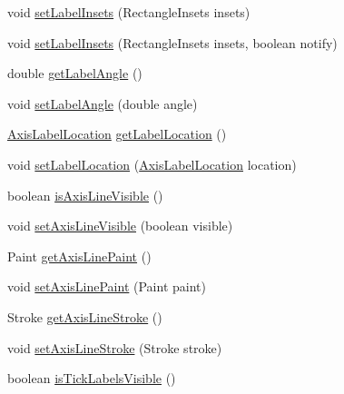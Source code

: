 \begin{DoxyCompactItemize}
\item 
void \mbox{\hyperlink{classorg_1_1jfree_1_1chart_1_1axis_1_1_axis_a970b20fba1da1a2de290f24306f12995}{set\+Label\+Insets}} (Rectangle\+Insets insets)
\item 
void \mbox{\hyperlink{classorg_1_1jfree_1_1chart_1_1axis_1_1_axis_aaf19ff43edd2fb4cc3512c4941ca9712}{set\+Label\+Insets}} (Rectangle\+Insets insets, boolean notify)
\item 
double \mbox{\hyperlink{classorg_1_1jfree_1_1chart_1_1axis_1_1_axis_a51cf668dba1c051f7c59e82668618f33}{get\+Label\+Angle}} ()
\item 
void \mbox{\hyperlink{classorg_1_1jfree_1_1chart_1_1axis_1_1_axis_a5f748a1d2aabe0b3f72120fbd7c9d28c}{set\+Label\+Angle}} (double angle)
\item 
\mbox{\hyperlink{classorg_1_1jfree_1_1chart_1_1axis_1_1_axis_label_location}{Axis\+Label\+Location}} \mbox{\hyperlink{classorg_1_1jfree_1_1chart_1_1axis_1_1_axis_a6cdaa1a27a6dbd3a090b9f87b2b58098}{get\+Label\+Location}} ()
\item 
void \mbox{\hyperlink{classorg_1_1jfree_1_1chart_1_1axis_1_1_axis_ad7787def8b9ce66d0d7c36f2600efe68}{set\+Label\+Location}} (\mbox{\hyperlink{classorg_1_1jfree_1_1chart_1_1axis_1_1_axis_label_location}{Axis\+Label\+Location}} location)
\item 
boolean \mbox{\hyperlink{classorg_1_1jfree_1_1chart_1_1axis_1_1_axis_a3bf6fd211b960ee08ef22a66016d3786}{is\+Axis\+Line\+Visible}} ()
\item 
void \mbox{\hyperlink{classorg_1_1jfree_1_1chart_1_1axis_1_1_axis_a9b25030b0d5848884c269ef1f9a73601}{set\+Axis\+Line\+Visible}} (boolean visible)
\item 
Paint \mbox{\hyperlink{classorg_1_1jfree_1_1chart_1_1axis_1_1_axis_a6d10951b7f082f0857398d5fa30642d2}{get\+Axis\+Line\+Paint}} ()
\item 
void \mbox{\hyperlink{classorg_1_1jfree_1_1chart_1_1axis_1_1_axis_a8b7c2af897382eca7088d489f60db36d}{set\+Axis\+Line\+Paint}} (Paint paint)
\item 
Stroke \mbox{\hyperlink{classorg_1_1jfree_1_1chart_1_1axis_1_1_axis_ab999e7ef49b87ddc75e07eb5658661b5}{get\+Axis\+Line\+Stroke}} ()
\item 
void \mbox{\hyperlink{classorg_1_1jfree_1_1chart_1_1axis_1_1_axis_acb2ef4578aff9ebd3fff36596b86ad9a}{set\+Axis\+Line\+Stroke}} (Stroke stroke)
\item 
boolean \mbox{\hyperlink{classorg_1_1jfree_1_1chart_1_1axis_1_1_axis_a243036cb23e9771ee4d26f9b749115cb}{is\+Tick\+Labels\+Visible}} ()

\end{DoxyCompactItemize}
